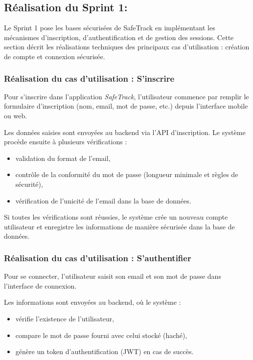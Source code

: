 \subsection{Réalisation du Sprint 1:}

Le Sprint 1 pose les bases sécurisées de SafeTrack en implémentant les mécanismes d'inscription, d'authentification et de gestion des sessions. Cette section décrit les réalisations techniques des principaux cas d'utilisation : création de compte et connexion sécurisée.

\subsubsection{Réalisation du cas d'utilisation : S'inscrire}

Pour s'inscrire dans l'application \textit{SafeTrack}, l'utilisateur commence par remplir le formulaire d'inscription (nom, email, mot de passe, etc.) depuis l'interface mobile ou web.

Les données saisies sont envoyées au backend via l'API d'inscription. Le système procède ensuite à plusieurs vérifications :

\begin{itemize}
    \item validation du format de l'email,
    \item contrôle de la conformité du mot de passe (longueur minimale et règles de sécurité),
    \item vérification de l'unicité de l'email dans la base de données.
\end{itemize}

Si toutes les vérifications sont réussies, le système crée un nouveau compte utilisateur et enregistre les informations de manière sécurisée dans la base de données.

\subsubsection{Réalisation du cas d'utilisation : S'authentifier}

Pour se connecter, l'utilisateur saisit son email et son mot de passe dans l'interface de connexion.

Les informations sont envoyées au backend, où le système :

\begin{itemize}
    \item vérifie l'existence de l'utilisateur,
    \item compare le mot de passe fourni avec celui stocké (haché),
    \item génère un token d'authentification (JWT) en cas de succès.
\end{itemize}

